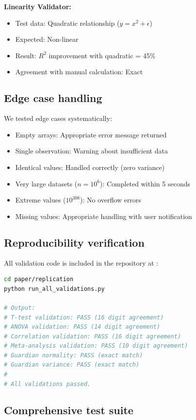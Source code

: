 \documentclass[article]{jss}
\begin{document}
\textbf{Linearity Validator:}
\begin{itemize}
\item Test data: Quadratic relationship ($y = x^2 + \epsilon$)
\item Expected: Non-linear
\item Result: $R^2$ improvement with quadratic = 45\%
\item Agreement with manual calculation: Exact
\end{itemize}

\subsection{Edge case handling}

We tested edge cases systematically:

\begin{itemize}
\item Empty arrays: Appropriate error message returned
\item Single observation: Warning about insufficient data
\item Identical values: Handled correctly (zero variance)
\item Very large datasets ($n = 10^6$): Completed within 5 seconds
\item Extreme values ($10^{308}$): No overflow errors
\item Missing values: Appropriate handling with user notification
\end{itemize}

\subsection{Reproducibility verification}

All validation code is included in the repository at :

\begin{lstlisting}[language=bash,caption={Running validation suite}]
cd paper/replication
python run_all_validations.py

# Output:
# T-test validation: PASS (16 digit agreement)
# ANOVA validation: PASS (14 digit agreement)
# Correlation validation: PASS (16 digit agreement)
# Meta-analysis validation: PASS (10 digit agreement)
# Guardian normality: PASS (exact match)
# Guardian variance: PASS (exact match)
#
# All validations passed.
\end{lstlisting}

\subsection{Comprehensive test suite}
\end{document}
